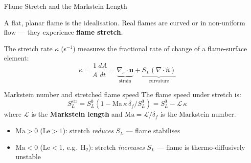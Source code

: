 \documentclass[12pt,aspectratio=169]{beamer}
\newcommand{\Le}{\mathrm{Le}}
\newcommand{\SL}{S_L}
\newcommand{\lf}{\delta_f}
\begin{document}
\begin{frame}{Flame Stretch and the Markstein Length}

  A flat, planar flame is the idealisation.
  Real flames are curved or in non-uniform flow ---
  they experience \textbf{flame stretch}.

  The stretch rate $\kappa$ (s$^{-1}$) measures the fractional rate
  of change of a flame-surface element:
  \[
    \kappa = \frac{1}{A}\frac{dA}{dt}
    = \underbrace{\nabla_s \cdot \mathbf{u}}_{\text{strain}}
    + \underbrace{\SL (\nabla \cdot \hat{n})}_{\text{curvature}}
  \]

  \begin{block}{Markstein number and stretched flame speed}
    The flame speed under stretch is:
    \[
      \SL^{\text{str}} = \SL^0\left(1 - \mathrm{Ma}\,\kappa\,\lf/\SL^0\right)
      = \SL^0 - \mathcal{L}\,\kappa
    \]
    where $\mathcal{L}$ is the \textbf{Markstein length}
    and $\mathrm{Ma} = \mathcal{L}/\lf$ is the Markstein number.
  \end{block}

  \begin{itemize}
    \item $\mathrm{Ma} > 0$ ($\Le > 1$): stretch \emph{reduces}
          $\SL$ --- flame stabilises
    \item $\mathrm{Ma} < 0$ ($\Le < 1$, e.g.\ H$_2$): stretch
          \emph{increases} $\SL$ --- flame is
          \alert{thermo-diffusively unstable}
  \end{itemize}
\end{frame}
\end{document}
